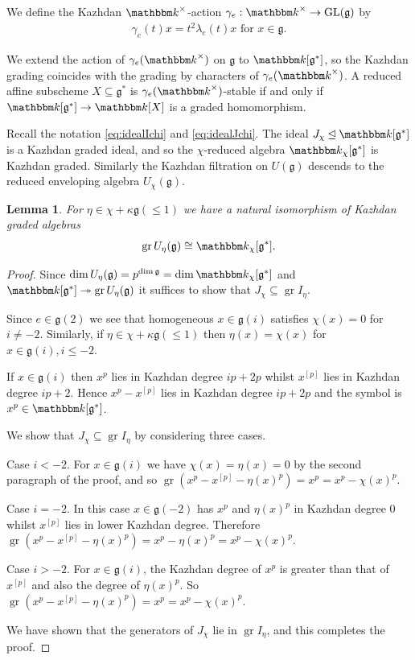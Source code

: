 \documentclass[twoside,12pt,reqno]{amsart}
\newtheorem{Lemma}[Theorem]{Lemma}
\theoremstyle{remark}
\numberwithin{equation}{section}
\def\onto{\twoheadrightarrow}
\def\k{{\mathbbm k}}
\def\gr{\operatorname{gr}}
\def\GL{\mathrm{GL}}
\def\g{{\mathfrak g}}
\begin{document}
We define the Kazhdan $\k^\times$-action $\gamma_e : \k^\times\to \GL(\g)$ by 
\begin{eqnarray}
\label{eq:Kazhdanaction}
\gamma_e(t) x = t^2 \lambda_e(t) x \text{ for } x\in \g.    
\end{eqnarray}

We extend the action of $\gamma_e(\k^\times)$ on $\g$ to $\k[\g^*]$, so the Kazhdan grading coincides with the grading by characters of $\gamma_e(\k^\times)$. A reduced affine subscheme $X\subseteq \g^*$ is $\gamma_e(\k^\times)$-stable if and only if $\k[\g^*] \to \k[X]$ is a graded homomorphism.


Recall the notation \eqref{eq:idealIchi} and \eqref{eq:idealJchi}. The ideal $J_\chi \unlhd \k[\g^*]$ is a Kazhdan graded ideal, and so the $\chi$-reduced algebra
$\k_\chi[\g^*]$ is Kazhdan graded. Similarly the Kazhdan filtration on $U(\g)$ descends to the reduced enveloping algebra $U_\chi(\g)$.

\begin{Lemma}\label{L:grUchi}
    For $\eta \in \chi + \kappa \g(\le 1)$ we have a natural isomorphism of Kazhdan graded algebras $$\gr U_\eta(\g) \cong \k_\chi[\g^*].$$
\end{Lemma}
\begin{proof}
        Since $\dim U_\eta(\g) = p^{\dim \g} = \dim \k_\chi[\g^*]$ and $\k[\g^*] \onto \gr U_\eta(\g)$ it suffices to show that $J_\chi \subseteq \gr I_\eta$.
        
        Since $e\in \g(2)$ we see that homogeneous $x \in \g(i)$ satisfies $\chi(x) = 0$ for $i \ne -2$. 
        Similarly, if $\eta \in \chi + \kappa\g(\le 1)$ then $\eta(x) = \chi(x)$ for $x \in \g(i), i\le -2$.

        If $x\in \g(i)$ then $x^p$ lies in Kazhdan degree $ip + 2p$ whilst $x^{[p]}$ lies in Kazhdan degree $ip + 2$. Hence $x^p - x^{[p]}$ lies in Kazhdan degree $ip + 2p$ and the symbol is $x^p \in \k[\g^*]$.
        
        We show that $J_\chi \subseteq \gr I_\eta$ by considering three cases.
        
        Case $i < -2$. For $x\in \g(i)$ we have $\chi(x) = \eta(x) = 0$ by the second paragraph of the proof, and so $\gr (x^p - x^{[p]} - \eta(x)^p) = x^p = x^p - \chi(x)^p$.

        Case $i = -2$. In this case $x\in \g(-2)$ has $x^p$ and $\eta(x)^p$ in Kazhdan degree 0 whilst $x^{[p]}$ lies in lower Kazhdan degree. Therefore $\gr (x^p - x^{[p]} - \eta(x)^p) = x^p - \eta(x)^p = x^p - \chi(x)^p$.

        Case $i > -2$. For $x \in \g(i)$, the Kazhdan degree of $x^p$ is greater than that of $x^{[p]}$ and also the degree of $\eta(x)^p$. So $\gr(x^p - x^{[p]} - \eta(x)^p) = x^p = x^p - \chi(x)^p$.

        We have shown that the generators of $J_\chi$ lie in $\gr I_\eta$, and this completes the proof.
\end{proof}
\end{document}
